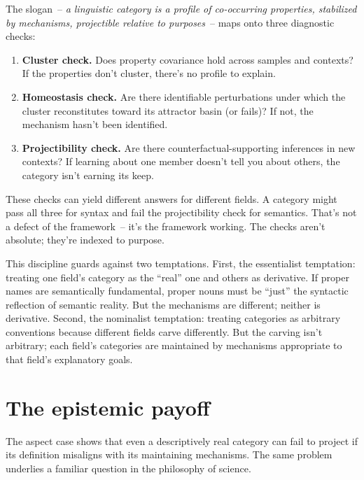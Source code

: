 The slogan~-- \emph{a linguistic category is a profile of co-occurring properties, stabilized by mechanisms, projectible relative to purposes}~-- maps onto three diagnostic checks:

\begin{enumerate}
    \item \textbf{Cluster check.} Does property covariance hold across samples and contexts? If the properties don't cluster, there's no profile to explain.
    \item \textbf{Homeostasis check.} Are there identifiable perturbations under which the cluster reconstitutes toward its attractor basin (or fails)? If not, the mechanism hasn't been identified.
    \item \textbf{Projectibility check.} Are there counterfactual-supporting inferences in new contexts? If learning about one member doesn't tell you about others, the category isn't earning its keep.
\end{enumerate}

These checks can yield different answers for different fields. A category might pass all three for syntax and fail the projectibility check for semantics. That's not a defect of the framework~-- it's the framework working. The checks aren't absolute; they're indexed to purpose.

This discipline guards against two temptations. First, the essentialist temptation: treating one field's category as the \enquote{real} one and others as derivative. If proper names are semantically fundamental, proper nouns must be \enquote{just} the syntactic reflection of semantic reality. But the mechanisms are different; neither is derivative. Second, the nominalist temptation: treating categories as arbitrary conventions because different fields carve differently. But the carving isn't arbitrary; each field's categories are maintained by mechanisms appropriate to that field's explanatory goals.


\section{The epistemic payoff}
\label{sec:7:epistemic-payoff}

The aspect case shows that even a descriptively real category can fail to project if its definition misaligns with its maintaining mechanisms. The same problem underlies a familiar question in the philosophy of science.

